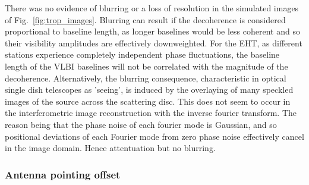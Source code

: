 There was no evidence of blurring or a loss of resolution in the simulated images of Fig.~\ref{fig:trop_images}. Blurring can result if the decoherence is considered proportional to baseline length, as longer baselines would be less coherent and so their visibility amplitudes are effectively downweighted. For the EHT, as different stations experience completely independent phase fluctuations, the baseline length of the VLBI baselines will not be correlated with the magnitude of the decoherence. Alternatively, the blurring consequence, characteristic in optical single dish telescopes as 'seeing', is induced by the overlaying of many speckled images of the source \citep{Narayan_1992} across the scattering disc. This does not seem to occur in the interferometric image reconstruction with the inverse fourier transform. The reason being that the phase noise of each fourier mode is Gaussian, and so positional deviations of each Fourier mode from zero phase noise effectively cancel in the image domain. Hence attentuation but no blurring.




\subsubsection{Antenna pointing offset}



